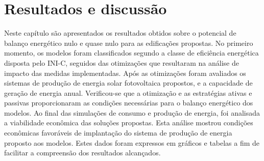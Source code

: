 \section{Resultados e discussão}
\noindent Neste capítulo são apresentados os resultados obtidos sobre o potencial de balanço energético nulo e quase nulo para as edificações propostas. No primeiro momento, os modelos foram classificados segundo a classe de eficiência energética disposta pelo INI-C, seguidos das otimizações que resultaram na análise de impacto das medidas implementadas. Após as otimizações foram avaliados os sistemas de produção de energia solar fotovoltaica propostos, e a capacidade de geração de energia anual.\vspace*{0.3cm} \newline
\noindent Verificou-se que a otimização e as estratégias ativas e passivas proporcionaram as condições necessárias para o balanço energético dos modelos. Ao final das simulações de consumo e produção de energia, foi analisada a viabilidade econômica das soluções propostas. Esta análise mostrou condições econômicas favoráveis de implantação do sistema de produção de energia proposto aos modelos.  Estes dados foram expressos em gráficos e tabelas a fim de facilitar a compreensão dos resultados alcançados.
